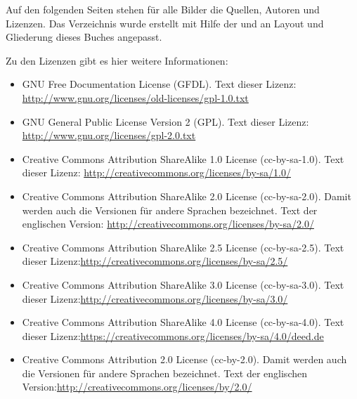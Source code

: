 \begin{small}
Auf den folgenden Seiten stehen für alle Bilder die Quellen, Autoren und Lizenzen. Das Verzeichnis wurde erstellt mit Hilfe der  und an Layout und Gliederung dieses Buches angepasst.

Zu den Lizenzen gibt es hier weitere Informationen:

\begin{itemize}
\item GNU Free Documentation License (GFDL). Text dieser Lizenz: \newline{}\url{http://www.gnu.org/licenses/old-licenses/gpl-1.0.txt}

\item GNU General Public License Version 2 (GPL). Text dieser Lizenz: \newline{}\url{http://www.gnu.org/licenses/gpl-2.0.txt} 

\item Creative Commons Attribution ShareAlike 1.0 License (cc-by-sa-1.0). Text dieser Lizenz: \newline{}\url{http://creativecommons.org/licenses/by-sa/1.0/} 

\item Creative Commons Attribution ShareAlike 2.0 License (cc-by-sa-2.0). Damit werden auch die Versionen f\"ur andere Sprachen bezeichnet. Text der englischen Version: \newline{}\url{http://creativecommons.org/licenses/by-sa/2.0/}

\item Creative Commons Attribution ShareAlike 2.5 License (cc-by-sa-2.5). Text dieser Lizenz:\newline{}\url{http://creativecommons.org/licenses/by-sa/2.5/}

\item Creative Commons Attribution ShareAlike 3.0 License (cc-by-sa-3.0). Text dieser Lizenz:\newline{}\url{http://creativecommons.org/licenses/by-sa/3.0/}

\item Creative Commons Attribution ShareAlike 4.0 License (cc-by-sa-4.0). Text dieser Lizenz:\newline{}\url{https://creativecommons.org/licenses/by-sa/4.0/deed.de}


\item Creative Commons Attribution 2.0 License (cc-by-2.0). Damit werden auch die Versionen f\"ur andere Sprachen bezeichnet. Text der englischen Version:\newline{}\url{http://creativecommons.org/licenses/by/2.0/}


\end{itemize}
\end{small}
